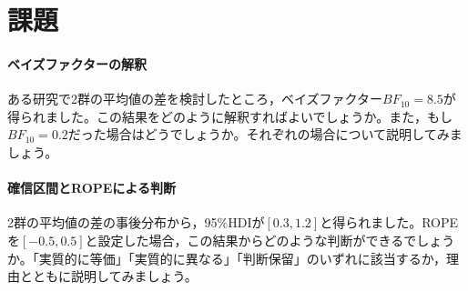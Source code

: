 \documentclass{ltjbook}
\begin{document}



\section{課題}
\paragraph{ベイズファクターの解釈}ある研究で2群の平均値の差を検討したところ，ベイズファクター$BF_{10}=8.5$が得られました。この結果をどのように解釈すればよいでしょうか。また，もし$BF_{10}=0.2$だった場合はどうでしょうか。それぞれの場合について説明してみましょう。
\paragraph{確信区間とROPEによる判断}2群の平均値の差の事後分布から，95\%HDIが$[0.3, 1.2]$と得られました。ROPEを$[-0.5, 0.5]$と設定した場合，この結果からどのような判断ができるでしょうか。「実質的に等価」「実質的に異なる」「判断保留」のいずれに該当するか，理由とともに説明してみましょう。
\end{document}
